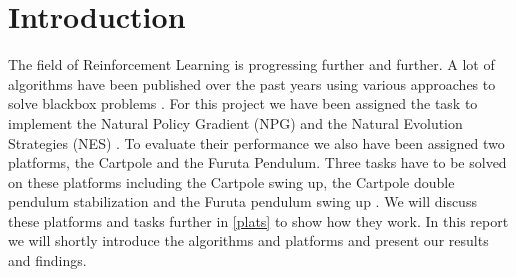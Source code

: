 \section{Introduction}
\label{intro}
The field of Reinforcement Learning is progressing further and further. A lot of algorithms have been published over the past years using various approaches to solve blackbox problems \cite{Wierstra14}. For this project we have been assigned the task to implement the Natural Policy Gradient (NPG) \cite{Rajeswaran2017,Kakade2001} and the Natural Evolution Strategies (NES) \cite{Wierstra14}. To evaluate their performance we also have been assigned two platforms, the Cartpole and the Furuta Pendulum. Three tasks have to be solved on these platforms including the Cartpole swing up, the Cartpole double pendulum stabilization and the Furuta pendulum swing up \cite{Furuta1991}. We will discuss these platforms and tasks further in \ref{plats} to show how they work. In this report we will shortly introduce the algorithms and platforms and present our results and findings.

